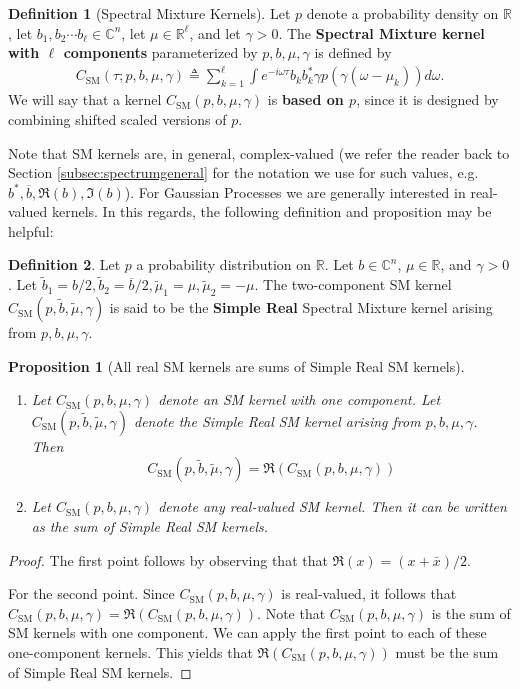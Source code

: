 \documentclass{article}
\newtheorem{prop}{Proposition}
\theoremstyle{definition}
\newtheorem{definition}{Definition}
\newcommand{\SM}{\mathrm{SM}}
\begin{document}
\begin{definition}[Spectral Mixture Kernels]
    Let $p$ denote a probability density on $\mathbb{R}$, let $b_1, b_2 \cdots b_{\ell} \in \mathbb{C}^{n}$, let $\mu \in \mathbb{R}^\ell$, and let $\gamma>0$.  The \textbf{Spectral Mixture kernel with $\ell$ components} parameterized by $p,b,\mu,\gamma$ is defined by
    \begin{gather*}
     C_\SM(\tau;p,b,\mu,\gamma) \triangleq \sum_{k=1}^{\ell}\int e^{-i\omega \tau} b_k b_k^* \gamma p(\gamma(\omega - \mu_k)) d \omega.
    \end{gather*}
    We will say that a kernel $C_\SM(p,b,\mu,\gamma)$ is \textbf{based on $p$}, since it is designed by combining shifted scaled versions of $p$.  
\end{definition}

Note that SM kernels are, in general, complex-valued (we refer the reader back to Section \ref{subsec:spectrumgeneral} for the notation we use for such values, e.g. $b^*,\overline{b},\Re(b),\Im(b)$).  For Gaussian Processes we are generally interested in real-valued kernels.  In this regards, the following definition and proposition may be helpful:

\begin{definition}
Let $p$ a probability distribution on $\mathbb{R}$.  Let $b \in \mathbb{C}^n$, $\mu\in \mathbb{R}$, and $\gamma>0$.  Let $\tilde b_1 = b/2,\tilde b_2=\overline{b}/2,\tilde \mu_1=\mu,\tilde\mu_2=-\mu$.  The two-component SM kernel $C_\SM(p,\tilde b,\tilde \mu,\gamma)$ is said to be the \textbf{Simple Real} Spectral Mixture kernel arising from $p,b,\mu,\gamma$.  
\end{definition}

\begin{prop}[All real SM kernels are sums of Simple Real SM kernels] \label{prop:allrealsm}
\hspace{1in}

\begin{enumerate}
    \item Let $C_\SM(p,b,\mu,\gamma)$ denote an SM kernel with one component.  Let $C_\SM(p,\tilde b,\tilde \mu,\gamma)$ denote the Simple Real SM kernel arising from $p,b,\mu,\gamma$.  Then
    \[
    C_\SM(p,\tilde b,\tilde \mu,\gamma) = \Re(C_\SM(p,b,\mu,\gamma))
    \]
    \item Let $C_\SM(p,b,\mu,\gamma)$ denote any real-valued SM kernel.  Then it can be written as the sum of Simple Real SM kernels.  
\end{enumerate}
\end{prop}
\begin{proof}
The first point follows by observing that that $\Re(x)=(x+\bar{x})/2$.  

For the second point.  Since $C_\SM(p,b,\mu,\gamma)$ is real-valued,  it follows that $C_\SM(p,b,\mu,\gamma)=\Re(C_\SM(p,b,\mu,\gamma))$.  Note that $C_\SM(p,b,\mu,\gamma)$ is the sum of SM kernels with one component.  We can apply the first point to each of these one-component kernels.  This yields that $\Re(C_\SM(p,b,\mu,\gamma))$ must be the sum of Simple Real SM kernels.
\end{proof}
\end{document}
